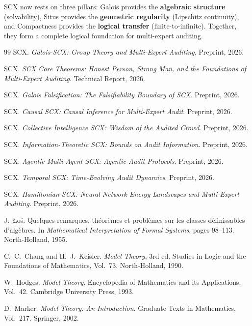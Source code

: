 \documentclass[12pt,a4paper]{article}
\theoremstyle{remark}
\begin{document}
SCX now rests on three pillars: Galois provides the \textbf{algebraic structure} (solvability), Situs provides the \textbf{geometric regularity} (Lipschitz continuity), and Compactness provides the \textbf{logical transfer} (finite-to-infinite). Together, they form a complete logical foundation for multi-expert auditing.
\begin{thebibliography}{99}
SCX.
\emph{Galois-SCX: Group Theory and Multi-Expert Auditing}.
Preprint, 2026.

SCX.
\emph{SCX Core Theorems: Honest Person, Strong Man, and the Foundations of Multi-Expert Auditing}.
Technical Report, 2026.

SCX.
\emph{Galois Falsification: The Falsifiability Boundary of SCX}.
Preprint, 2026.

SCX.
\emph{Causal SCX: Causal Inference for Multi-Expert Audit}.
Preprint, 2026.

SCX.
\emph{Collective Intelligence SCX: Wisdom of the Audited Crowd}.
Preprint, 2026.

SCX.
\emph{Information-Theoretic SCX: Bounds on Audit Information}.
Preprint, 2026.

SCX.
\emph{Agentic Multi-Agent SCX: Agentic Audit Protocols}.
Preprint, 2026.

SCX.
\emph{Temporal SCX: Time-Evolving Audit Dynamics}.
Preprint, 2026.

SCX.
\emph{Hamiltonian-SCX: Neural Network Energy Landscapes and Multi-Expert Auditing}.
Preprint, 2026.

J.~Łoś.
Quelques remarques, théorèmes et problèmes sur les classes définissables d'algèbres.
In \emph{Mathematical Interpretation of Formal Systems}, pages 98--113.
North-Holland, 1955.

C.~C.~Chang and H.~J.~Keisler.
\emph{Model Theory}, 3rd ed.
Studies in Logic and the Foundations of Mathematics, Vol.~73.
North-Holland, 1990.

W.~Hodges.
\emph{Model Theory}.
Encyclopedia of Mathematics and its Applications, Vol.~42.
Cambridge University Press, 1993.

D.~Marker.
\emph{Model Theory: An Introduction}.
Graduate Texts in Mathematics, Vol.~217.
Springer, 2002.


\end{thebibliography}
\end{document}
